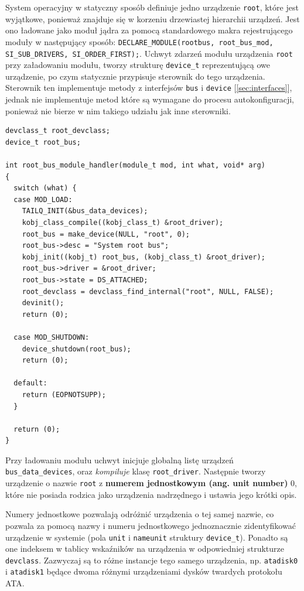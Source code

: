 \documentclass[shortabstract,inz]{iithesis}
\begin{document}
System operacyjny w statyczny sposób definiuje jedno urządzenie \texttt{root}, które
jest wyjątkowe, ponieważ znajduje się w korzeniu drzewiastej hierarchii urządzeń.
Jest ono ładowane jako moduł jądra za pomocą standardowego makra rejestrującego 
moduły w następujący sposób:
\texttt{DECLARE\_MODULE(rootbus, root\_bus\_mod, SI\_SUB\_DRIVERS, SI\_ORDER\_FIRST);}.
Uchwyt zdarzeń modułu urządzenia \texttt{root} przy załadowaniu modułu, tworzy 
strukturę \texttt{device\_t} reprezentującą owe urządzenie, po czym statycznie 
przypisuje sterownik do tego urządzenia. Sterownik ten implementuje metody z interfejsów
\texttt{bus} i \texttt{device} [\ref{sec:interfaces}], 
jednak nie implementuje metod które są wymagane
do procesu autokonfiguracji, ponieważ nie bierze w nim takiego udziału jak inne sterowniki.
\newpage
\begin{lstlisting}[caption={Uchwyt zdarzeń modułu urządzenia root.}]
devclass_t root_devclass;
device_t root_bus;

int root_bus_module_handler(module_t mod, int what, void* arg)
{
  switch (what) {
  case MOD_LOAD:
    TAILQ_INIT(&bus_data_devices);
    kobj_class_compile((kobj_class_t) &root_driver);
    root_bus = make_device(NULL, "root", 0);
    root_bus->desc = "System root bus";
    kobj_init((kobj_t) root_bus, (kobj_class_t) &root_driver);
    root_bus->driver = &root_driver;
    root_bus->state = DS_ATTACHED;
    root_devclass = devclass_find_internal("root", NULL, FALSE);
    devinit();
    return (0);  

  case MOD_SHUTDOWN:
    device_shutdown(root_bus);
    return (0);

  default:
    return (EOPNOTSUPP);
  }
      
  return (0);
}
\end{lstlisting}

Przy ładowaniu modułu uchwyt inicjuje globalną listę urządzeń \texttt{bus\_data\_devices},
oraz \textit{kompiluje} klasę \texttt{root\_driver}.
Następnie tworzy urządzenie o nazwie \texttt{root}
z \textbf{numerem jednostkowym (ang. unit number)} 0, które nie posiada rodzica 
jako urządzenia nadrzędnego i ustawia jego krótki opis.

Numery jednostkowe pozwalają odróżnić urządzenia o tej samej nazwie, co pozwala
za pomocą nazwy i numeru jednostkowego jednoznacznie zidentyfikować urządzenie w systemie
(pola \texttt{unit} i \texttt{nameunit} struktury \texttt{device\_t}).
Ponadto są one indeksem w tablicy wskaźników na urządzenia w odpowiedniej
strukturze \texttt{devclass}.
Zazwyczaj są to różne instancje tego samego urządzenia, np. \texttt{atadisk0} i
\texttt{atadisk1} będące dwoma różnymi urządzeniami dysków twardych protokołu ATA.
\end{document}
